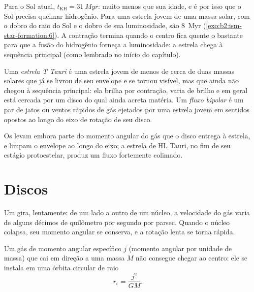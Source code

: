 Para o Sol atual, $t_{\mathrm{KH}} = \qty{31}{Myr}$: muito menos que sua
idade, e é por isso que o Sol precisa queimar hidrogênio. Para uma estrela jovem de uma massa
solar, com o dobro do raio do Sol e o dobro de sua luminosidade, são \qty{8}{Myr}
(\cref{exo:b2:ism-star-formation:6}). A contração termina quando o centro fica quente o bastante para que a fusão do hidrogênio
forneça a luminosidade: a estrela chega à sequência principal (como lembrado no início do capítulo).

\begin{definition}\label{def:b2:ism-star-formation:t-tauri}
Uma \emph{estrela T Tauri} é uma estrela jovem de menos de cerca de
duas massas solares que já se livrou de seu envelope e se tornou visível, mas que ainda não
chegou à sequência principal: ela brilha por contração, varia de
brilho e em geral está cercada por um disco do qual ainda
acreta matéria. Um \emph{fluxo bipolar} é um par de jatos
ou ventos rápidos de gás ejetados por uma estrela jovem em sentidos opostos ao longo do
eixo de rotação de seu disco.
\end{definition}

Os  levam embora parte do momento angular do gás que o disco
entrega à estrela, e limpam o envelope ao longo do eixo; a estrela de
HL Tauri, no fim de seu estágio protoestelar, produz um fluxo
fortemente colimado.

\section{Discos}

Um  gira, lentamente: de um lado a outro de um núcleo, a velocidade do gás varia de alguns
décimos de quilômetro por segundo por parsec. Quando o núcleo colapsa, seu
momento angular se conserva, e a rotação lenta se torna rápida.

\begin{proposition}\label{prop:b2:ism-star-formation:centrifugal}
Um gás de momento angular específico $j$ (momento angular por unidade de massa)
que cai em direção a uma massa $M$ não consegue chegar ao centro: ele se instala em uma
órbita circular de raio
\[
  r_c = \frac{j^2}{G M}.
\]
\end{proposition}


